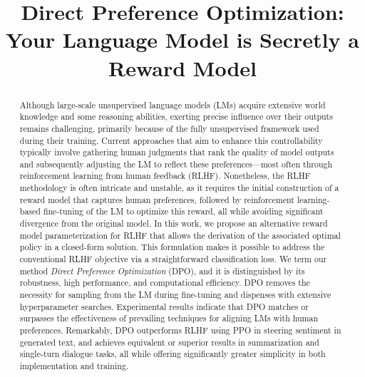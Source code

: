 \title{Direct Preference Optimization: Your Language Model is Secretly a Reward Model}

\begin{abstract}
Although large-scale unsupervised language models (LMs) acquire extensive world knowledge and some reasoning abilities, exerting precise influence over their outputs remains challenging, primarily because of the fully unsupervised framework used during their training. Current approaches that aim to enhance this controllability typically involve gathering human judgments that rank the quality of model outputs and subsequently adjusting the LM to reflect these preferences—most often through reinforcement learning from human feedback (RLHF). Nonetheless, the RLHF methodology is often intricate and unstable, as it requires the initial construction of a reward model that captures human preferences, followed by reinforcement learning-based fine-tuning of the LM to optimize this reward, all while avoiding significant divergence from the original model. In this work, we propose an alternative reward model parameterization for RLHF that allows the derivation of the associated optimal policy in a closed-form solution. This formulation makes it possible to address the conventional RLHF objective via a straightforward classification loss. We term our method \textit{Direct Preference Optimization} (DPO), and it is distinguished by its robustness, high performance, and computational efficiency. DPO removes the necessity for sampling from the LM during fine-tuning and dispenses with extensive hyperparameter searches. Experimental results indicate that DPO matches or surpasses the effectiveness of prevailing techniques for aligning LMs with human preferences. Remarkably, DPO outperforms RLHF using PPO in steering sentiment in generated text, and achieves equivalent or superior results in summarization and single-turn dialogue tasks, all while offering significantly greater simplicity in both implementation and training.
\end{abstract}

